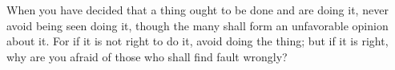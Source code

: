 When you  have decided that a  thing ought to be  done and are doing  it, never
avoid being  seen doing it, though  the many shall form  an unfavorable opinion
about it. For if it is not right to  do it, avoid doing the thing; but if it is
right, why are you afraid of those who shall find fault wrongly?
